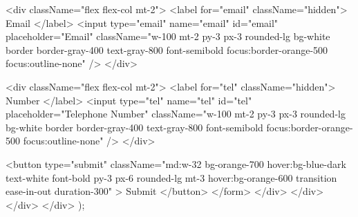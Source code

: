 {                                                <div className="flex flex-col mt-2">
                                                    <label for="email" className="hidden">
                                                        Email
                                                    </label>
                                                    <input
                                                        type="email"
                                                        name="email"
                                                        id="email"
                                                        placeholder="Email"
                                                        className="w-100 mt-2 py-3 px-3 rounded-lg bg-white border border-gray-400 text-gray-800 font-semibold focus:border-orange-500 focus:outline-none"
                                                    />
                                                </div>
                    
                                                <div className="flex flex-col mt-2">
                                                    <label for="tel" className="hidden">
                                                        Number
                                                    </label>
                                                    <input
                                                        type="tel"
                                                        name="tel"
                                                        id="tel"
                                                        placeholder="Telephone Number"
                                                        className="w-100 mt-2 py-3 px-3 rounded-lg bg-white border border-gray-400 text-gray-800 font-semibold focus:border-orange-500 focus:outline-none"
                                                    />
                                                </div>
                    
                                                <button
                                                    type="submit"
                                                    className="md:w-32 bg-orange-700 hover:bg-blue-dark text-white font-bold py-3 px-6 rounded-lg mt-3 hover:bg-orange-600 transition ease-in-out duration-300"
                                                >
                                                    Submit
                                                </button>
                                            </form>
                                        </div>
                                    </div>
                                </div>
                            </div>
                        );
                    }


